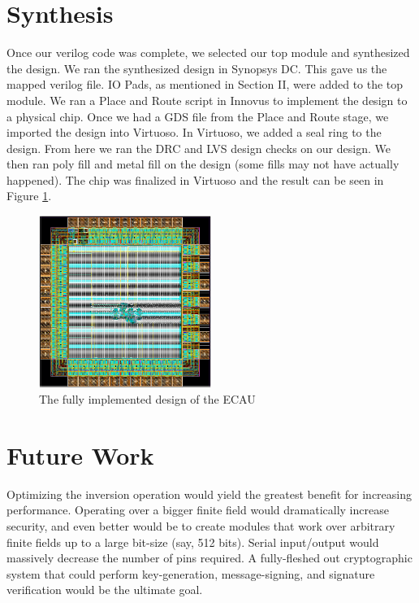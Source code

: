 \documentclass{IEEEtran}
\begin{document}
\section{Synthesis}

Once our verilog code was complete, we selected our top module and synthesized the design. We ran the synthesized design in Synopsys DC. This gave us the mapped verilog file. IO Pads, as mentioned in Section II, were added to the top module. We ran a Place and Route script in Innovus to implement the design to a physical chip. Once we had a GDS file from the Place and Route stage, we imported the design into Virtuoso. In Virtuoso, we added a seal ring to the design. From here we ran the DRC and LVS design checks on our design. We then ran poly fill and metal fill on the design (some fills may not have actually happened). The chip was finalized in Virtuoso and the result can be seen in Figure \ref{chip}.

\begin{figure}%
\centering
\captionsetup{justification=centering}
\includegraphics[width=0.5\textwidth]{images/chip.png}
\caption{The fully implemented design of the ECAU}
\label{chip}
\end{figure}

\section{Future Work}
Optimizing the inversion operation would yield the greatest benefit for increasing performance. Operating over a bigger finite field would dramatically increase security, and even better would be to create modules that work over arbitrary finite fields up to a large bit-size (say, 512 bits). Serial input/output would massively decrease the number of pins required. A fully-fleshed out cryptographic system that could perform key-generation, message-signing, and signature verification would be the ultimate goal. 
\end{document}
